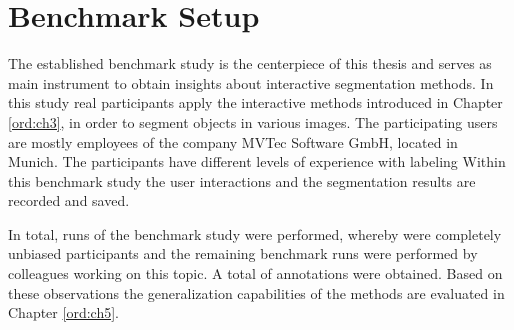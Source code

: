
\chapter{Benchmark Setup}\label{ord:ch4}


The established benchmark study is the centerpiece of this thesis and serves as main instrument to obtain insights about interactive segmentation methods.
In this study real participants apply the interactive methods introduced in Chapter \ref{ord:ch3}, in order to segment objects in various images.
The participating users are mostly employees of the company MVTec Software GmbH, located in Munich.
The participants have different levels of experience with labeling
Within this benchmark study the user interactions and the segmentation results are recorded and saved.

In total, \getNumberBenchmarkRuns \space runs of the benchmark study were performed, whereby \getNumberBenchmarkParticipants \space were completely unbiased participants and the remaining benchmark runs were performed by colleagues working on this topic.
A total of \getNumberBenchmarkAnnotations \space annotations were obtained.
Based on these observations the generalization capabilities of the methods are evaluated in Chapter \ref{ord:ch5}.





